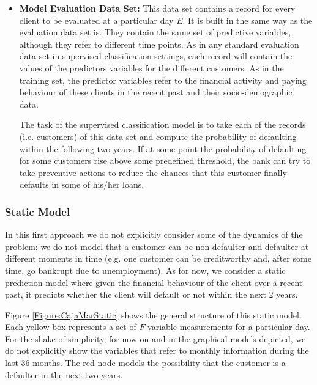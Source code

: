 \begin{itemize}
\item \textbf{Model Evaluation Data Set:} This data set contains a record for every client to be evaluated at a particular day $E$. It is built in the same way as the evaluation data set is. They contain the same set of predictive variables, although they refer to different time points.  As in any standard evaluation data set in supervised classification settings, each record will contain the values of the predictors variables for the different customers. As in the training set, the predictor variables refer to the financial activity and paying behaviour of these clients in the recent past and their socio-demographic data. 


The task of the supervised classification model is to take each of the records (i.e. customers) of this data set and compute the probability of defaulting within the following two years. If at some point the probability of defaulting for some customers rise above some predefined threshold, the bank can try to take preventive actions to reduce the chances that this customer finally defaults in some of his/her loans.

\end{itemize}
 

\subsubsection*{Static Model} 

In this first approach we do not explicitly consider some of the dynamics of the problem: we do not model that a customer can be non-defaulter and defaulter at different moments in time (e.g. one customer can be creditworthy and, after some time, go bankrupt due to unemployment). As for now, we consider a static prediction model where given the financial behaviour of the client over a recent past, it predicts whether the client will default or not within the next 2 years. 

Figure \ref{Figure:CajaMarStatic} shows the general structure of this static model. Each yellow box represents a set of $F$ variable measurements for a particular day.
For the shake of simplicity, for now on and in the graphical models depicted, we do not explicitly show the variables that refer to monthly information during the last 36 months. The red node models the possibility that the customer is a defaulter in the next two years. 

